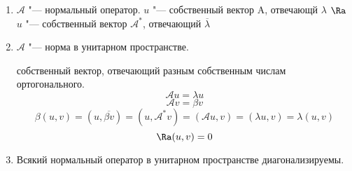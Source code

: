 \begin{conseq}
    \begin{enumerate}
    \item 
    $\mathscr{A}$ "--- нормальный оператор. 
    $u$ "--- собственный вектор A, отвечающй  $\lambda$
    $\Ra$  $u$ "--- собственный вектор $\mathscr{A}^*$, отвечающий $\overline{\lambda}$
    \item 
    $\mathscr{A}$ "--- норма в унитарном пространстве. 

    собственный вектор, отвечающий разным собственным числам ортогонального. 
    $$\mathscr{A}u = \lambda u$$
    $$\mathscr{A}v = \beta v$$
    $$\beta(u, v) = (u, \overline{\beta v}) = (u, \mathscr{A}^*v) = (\mathscr{A}u, v) = (\lambda u, v) = \lambda (u, v)$$
    $$\Ra (u, v) = 0$$
    \item 

    Всякий нормальный оператор в унитарном пространстве диагонализируемы. 
    \end{enumerate}
\end{conseq}


